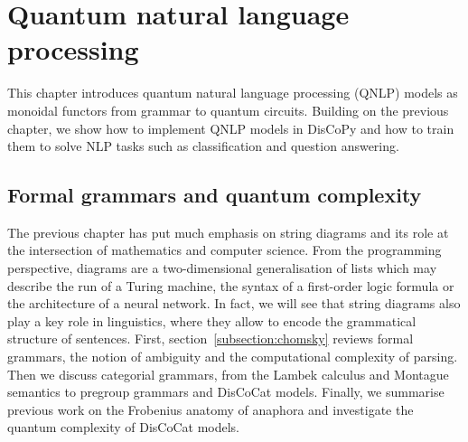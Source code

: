 
\chapter{Quantum natural language processing} \label{chapter-2:qnlp}

This chapter introduces quantum natural language processing (QNLP) models as monoidal functors from grammar to quantum circuits.
Building on the previous chapter, we show how to implement QNLP models in DisCoPy and how to train them to solve NLP tasks such as classification and question answering.

\section{Formal grammars and quantum complexity}\label{section:NLP}

The previous chapter has put much emphasis on string diagrams and its role at the intersection of mathematics and computer science.
From the programming perspective, diagrams are a two-dimensional generalisation of lists which may describe the run of a Turing machine, the syntax of a first-order logic formula or the architecture of a neural network.
In fact, we will see that string diagrams also play a key role in linguistics, where they allow to encode the grammatical structure of sentences.
First, section~\ref{subsection:chomsky} reviews formal grammars, the notion of ambiguity and the computational complexity of parsing.
Then we discuss categorial grammars, from the Lambek calculus and Montague semantics to pregroup grammars and DisCoCat models.
Finally, we summarise previous work on the Frobenius anatomy of anaphora and investigate the quantum complexity of DisCoCat models.
